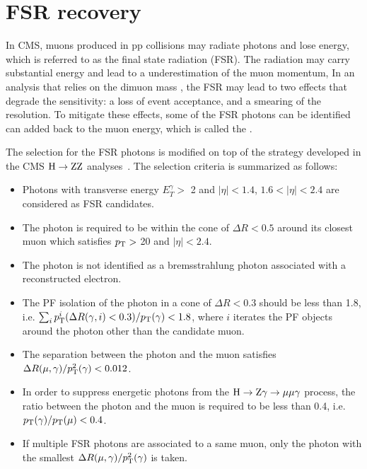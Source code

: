 \section{FSR recovery} \label{sec:fsr}

In CMS, muons produced in pp collisions may radiate photons and lose energy, which is referred to as the final state radiation (FSR).
The radiation may carry substantial energy and lead to a underestimation of the muon momentum,
In an analysis that relies on the dimuon mass \mmm, the FSR may lead to two effects that degrade the sensitivity:
a loss of event acceptance, and a smearing of the \mmm resolution.
To mitigate these effects, some of the FSR photons can be identified can added back to the muon energy, which is called the \FSR.

The selection for the FSR photons is modified on top of the strategy developed in the CMS $\mathrm{H} \to \mathrm{Z}\mathrm{Z}$ analyses~\cite{Sirunyan:2017exp, Sirunyan:2018qlb}.
The selection criteria is summarized as follows:
\begin{itemize}
  \item Photons with transverse energy $E^{\gamma}_{T} > $ 2 \GeV and $|\eta|<1.4$, $1.6<|\eta|<2.4$ are considered as FSR candidates.
  \item The photon is required to be within the cone of $\Delta{}R<0.5$ around its closest muon which satisfies $p_{\mathrm{T}} >$ 20 \GeV and $|\eta| < 2.4$.
  \item The photon is not identified as a bremsstrahlung photon associated with a reconstructed electron.
  \item The PF isolation of the photon in a cone of $\Delta{}R < 0.3$ should be less than 1.8, i.e. $\sum_{i}p_{\mathrm{T}}^{i}(\Delta{}R(\gamma, i)<0.3)/p_{\mathrm{T}}(\gamma) < 1.8$, 
        where $i$ iterates the PF objects around the photon other than the candidate muon.
  \item The separation between the photon and the muon satisfies $\Delta{}R(\mu, \gamma)/p_{\mathrm{T}}^{2}(\gamma) < 0.012$.
  \item In order to suppress energetic photons from the $\mathrm{H} \to \mathrm{Z}\gamma \to \mu\mu\gamma$ process,
        the \pt ratio between the photon and the muon is required to be less than 0.4, i.e. $p_{\mathrm{T}}(\gamma)/p_{\mathrm{T}}(\mu) < 0.4$.
  \item If multiple FSR photons are associated to a same muon, only the photon with the smallest $\Delta{}R(\mu, \gamma)/p_{\mathrm{T}}^{2}(\gamma)$ is taken.
\end{itemize}

